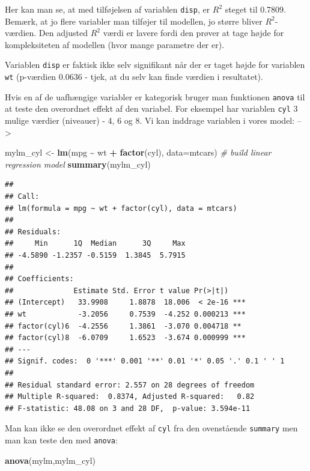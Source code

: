 \documentclass[
]{book}
\newenvironment{Shaded}{\begin{snugshade}}{\end{snugshade}}
\newcommand{\AttributeTok}[1]{\textcolor[rgb]{0.13,0.29,0.53}{#1}}
\newcommand{\CommentTok}[1]{\textcolor[rgb]{0.56,0.35,0.01}{\textit{#1}}}
\newcommand{\FunctionTok}[1]{\textcolor[rgb]{0.13,0.29,0.53}{\textbf{#1}}}
\newcommand{\NormalTok}[1]{#1}
\newcommand{\OtherTok}[1]{\textcolor[rgb]{0.56,0.35,0.01}{#1}}
\newcommand{\SpecialCharTok}[1]{\textcolor[rgb]{0.81,0.36,0.00}{\textbf{#1}}}
\theoremstyle{definition}
\theoremstyle{definition}
\theoremstyle{definition}
\theoremstyle{definition}
\theoremstyle{remark}
\begin{document}
Her kan man se, at med tilføjelsen af variablen \texttt{disp}, er \(R^2\) steget til 0.7809. Bemærk, at jo flere variabler man tilføjer til modellen, jo større bliver \(R^2\)-værdien. Den adjusted \(R^2\) værdi er lavere fordi den prøver at tage højde for kompleksiteten af modellen (hvor mange parametre der er).

Variablen \texttt{disp} er faktisk ikke selv signifikant når der er taget højde for variablen \texttt{wt} (p-værdien 0.0636 - tjek, at du selv kan finde værdien i resultatet).

Hvis en af de uafhængige variabler er kategorisk bruger man funktionen \texttt{anova} til at teste den overordnet effekt af den variabel. For eksempel har variablen \texttt{cyl} 3 mulige værdier (niveauer) - 4, 6 og 8. Vi kan inddrage variablen i vores model: --\textgreater{}

\begin{Shaded}
\begin{Highlighting}[]
\NormalTok{mylm\_cyl }\OtherTok{\textless{}{-}} \FunctionTok{lm}\NormalTok{(mpg }\SpecialCharTok{\textasciitilde{}}\NormalTok{ wt }\SpecialCharTok{+} \FunctionTok{factor}\NormalTok{(cyl), }\AttributeTok{data=}\NormalTok{mtcars) }\CommentTok{\# build linear regression model}
\FunctionTok{summary}\NormalTok{(mylm\_cyl)}
\end{Highlighting}
\end{Shaded}

\begin{verbatim}
## 
## Call:
## lm(formula = mpg ~ wt + factor(cyl), data = mtcars)
## 
## Residuals:
##     Min      1Q  Median      3Q     Max 
## -4.5890 -1.2357 -0.5159  1.3845  5.7915 
## 
## Coefficients:
##              Estimate Std. Error t value Pr(>|t|)    
## (Intercept)   33.9908     1.8878  18.006  < 2e-16 ***
## wt            -3.2056     0.7539  -4.252 0.000213 ***
## factor(cyl)6  -4.2556     1.3861  -3.070 0.004718 ** 
## factor(cyl)8  -6.0709     1.6523  -3.674 0.000999 ***
## ---
## Signif. codes:  0 '***' 0.001 '**' 0.01 '*' 0.05 '.' 0.1 ' ' 1
## 
## Residual standard error: 2.557 on 28 degrees of freedom
## Multiple R-squared:  0.8374, Adjusted R-squared:   0.82 
## F-statistic: 48.08 on 3 and 28 DF,  p-value: 3.594e-11
\end{verbatim}

Man kan ikke se den overordnet effekt af \texttt{cyl} fra den ovenstående \texttt{summary} men man kan teste den med \texttt{anova}:

\begin{Shaded}
\begin{Highlighting}[]
\FunctionTok{anova}\NormalTok{(mylm,mylm\_cyl)}
\end{Highlighting}
\end{Shaded}
\end{document}
